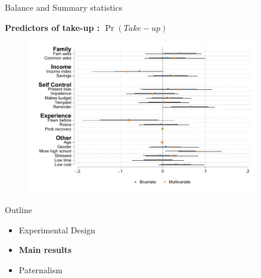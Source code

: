 \documentclass[8pt]{beamer}
\begin{document}
\begin{frame}{Balance and Summary statistics}
    \begin{table}[H]
\label{SS}
\begin{center}
\resizebox{.65\textwidth}{!}{
\scriptsize{}
}
\end{center}
\end{table}
\end{frame}




\begin{frame}
\textbf{Predictors of take-up : $\Pr(Take-up)$}

\begin{figure}[H]
    \begin{center}
        \includegraphics[width=0.9\textwidth]{Figuras/determinants_takeup_reg.pdf}
    \end{center}
    \end{figure}
\end{frame}





\begin{frame}{Outline}
     \begin{itemize}
         \vfill\item Experimental Design
         \vfill\item \textbf{Main results}
         \vfill\item Paternalism 
     \end{itemize}
\end{frame}
\end{document}
